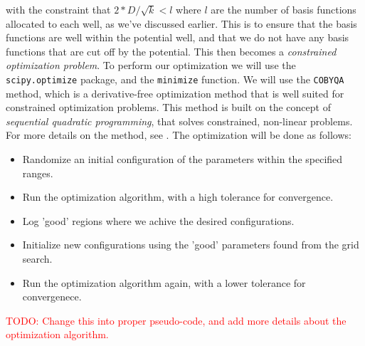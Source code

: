 \documentclass{subfiles}
\begin{document}
with the constraint that $2 * D / \sqrt{k} < l$ where $l$ are the number of basis functions allocated to each well, as we've discussed earlier. This is to ensure that the basis functions are well within the potential well, and that we do not have any basis functions that are cut off by the potential. This then becomes a \emph{constrained optimization problem}. To perform our optimization we will use the \texttt{scipy.optimize} package, and the \texttt{minimize} function. We will use the \texttt{COBYQA} method, which is a derivative-free optimization method that is well suited for constrained optimization problems. This method is built on the concept of \emph{sequential quadratic programming}, that solves constrained, non-linear problems. For more details on the method, see \cite{razh_cobyqa}. The optimization will be done as follows:
\begin{itemize}
    \item Randomize an initial configuration of the parameters within the specified ranges.
    \item Run the optimization algorithm, with a high tolerance for convergence.
    \item Log 'good' regions where we achive the desired configurations.
    \item Initialize new configurations using the 'good' parameters found from the grid search.
    \item Run the optimization algorithm again, with a lower tolerance for convergenece.
\end{itemize}
\textcolor{red}{TODO: Change this into proper pseudo-code, and add more details about the optimization algorithm.}
\end{document}
